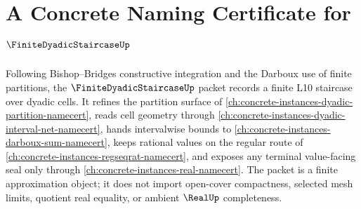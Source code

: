 \chapter{A Concrete Naming Certificate for $\FiniteDyadicStaircaseUp$}
\label{ch:concrete-instances-finite-dyadic-staircase-namecert}

Following Bishop--Bridges constructive integration and the Darboux use of finite partitions, the $\FiniteDyadicStaircaseUp$ packet records a finite L10 staircase over dyadic cells. It refines the partition surface of \autoref{ch:concrete-instances-dyadic-partition-namecert}, reads cell geometry through \autoref{ch:concrete-instances-dyadic-interval-net-namecert}, hands intervalwise bounds to \autoref{ch:concrete-instances-darboux-sum-namecert}, keeps rational values on the regular route of \autoref{ch:concrete-instances-regseqrat-namecert}, and exposes any terminal value-facing seal only through \autoref{ch:concrete-instances-real-namecert}. The packet is a finite approximation object; it does not import open-cover compactness, selected mesh limits, quotient real equality, or ambient $\RealUp$ completeness.



